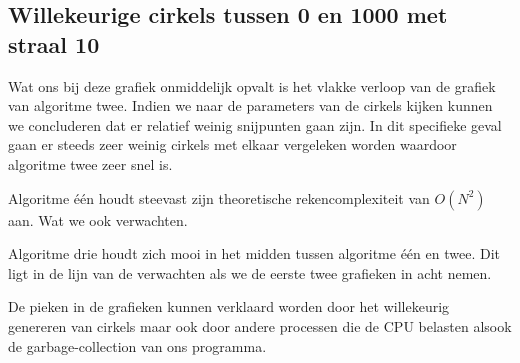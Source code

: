 \documentclass[11pt,a4paper]{article}
\begin{document}
\subsection{Willekeurige cirkels tussen 0 en 1000 met straal 10}

Wat ons bij deze grafiek onmiddelijk opvalt is het vlakke verloop van de grafiek van algoritme twee. Indien we naar de parameters van de cirkels kijken kunnen we concluderen dat er relatief weinig snijpunten gaan zijn. In dit specifieke geval gaan er steeds zeer weinig cirkels met elkaar vergeleken worden waardoor algoritme twee zeer snel is.

Algoritme \'e\'en houdt steevast zijn theoretische rekencomplexiteit van $O(N^{2})$ aan. Wat we ook verwachten.

Algoritme drie houdt zich mooi in het midden tussen algoritme \'e\'en en twee. Dit ligt in de lijn van de verwachten als we de eerste twee grafieken in acht nemen.

De pieken in de grafieken kunnen verklaard worden door het willekeurig genereren van cirkels maar ook door andere processen die de CPU belasten alsook de garbage-collection van ons programma. 
\end{document}
